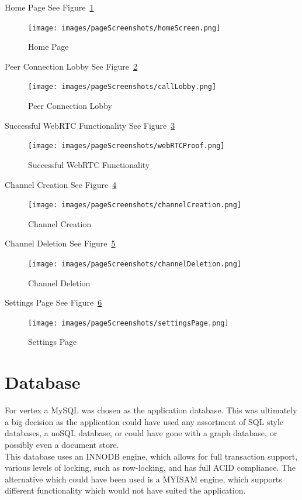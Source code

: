 Home Page See Figure~\ref{image:homePage}
\begin{figure}[h!]
    \caption{Home Page}
    \label{image:homePage}
    \centering
    \texttt{[image: images/pageScreenshots/homeScreen.png]}
\end{figure}

Peer Connection Lobby See Figure~\ref{image:peerConnectionLobby}
\begin{figure}[h!]
    \caption{Peer Connection Lobby}
    \label{image:peerConnectionLobby}
    \centering
    \texttt{[image: images/pageScreenshots/callLobby.png]}
\end{figure}

Successful WebRTC Functionality See Figure~\ref{image:webRTCProof}
\begin{figure}[h!]
    \caption{Successful WebRTC Functionality}
    \label{image:webRTCProof}
    \centering
    \texttt{[image: images/pageScreenshots/webRTCProof.png]}
\end{figure}

Channel Creation See Figure~\ref{image:channelCreation}
\begin{figure}[h!]
    \caption{Channel Creation}
    \label{image:channelCreation}
    \centering
    \texttt{[image: images/pageScreenshots/channelCreation.png]}
\end{figure}

Channel Deletion See Figure~\ref{image:channelDeletion}
\begin{figure}[h!]
    \caption{Channel Deletion}
    \label{image:channelDeletion}
    \centering
    \texttt{[image: images/pageScreenshots/channelDeletion.png]}
\end{figure}

Settings Page See Figure~\ref{image:settingsPage}
\begin{figure}[h!]
    \caption{Settings Page}
    \label{image:settingsPage}
    \centering
    \texttt{[image: images/pageScreenshots/settingsPage.png]}
\end{figure}


\section{Database}
For vertex a MySQL was chosen as the application database. This was ultimately a big decision as the application could have used any assortment of SQL style databases, a noSQL database, or could have gone with a graph database, or possibly even a document store.
\\ This database uses an INNODB engine, which allows for full transaction support, various levels of locking, such as row-locking, and has full ACID compliance. The alternative which could have been used is a MYISAM engine, which supports different functionality which would not have suited the application.

